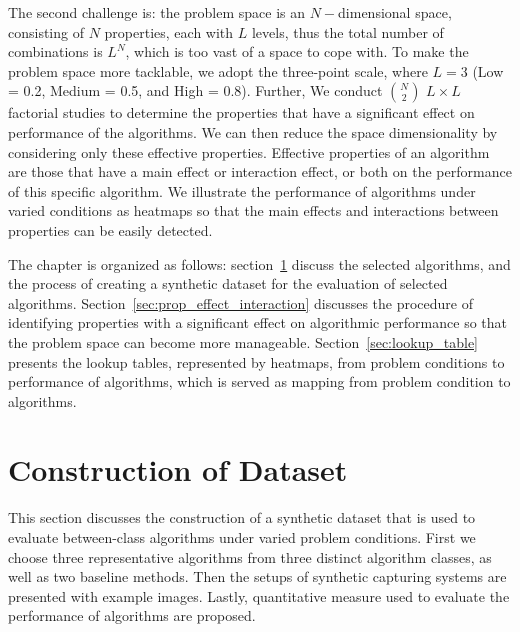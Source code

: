 The second challenge is: the problem space is an $N-$dimensional space, consisting of $N$ properties, each with $L$ levels, thus the total number of combinations is $L^N$, which is too vast of a space to cope with. To make the problem space more tacklable, we adopt the three-point scale, where $L=3$ (Low = 0.2, Medium = 0.5, and High = 0.8). Further, We conduct $\binom{N}{2}$ $L\times L$ factorial studies to determine the properties that have a significant effect on performance of the algorithms. We can then reduce the space dimensionality by considering only these effective properties. Effective properties of an algorithm are those that have a main effect or interaction effect, or both on the performance of this specific algorithm. We illustrate the performance of algorithms under varied conditions as heatmaps so that the main effects and interactions between properties can be easily detected.

The chapter is organized as follows: section~\ref{sec:create_synth_dataset} discuss the selected algorithms, and the process of creating a synthetic dataset for the evaluation of selected algorithms. Section~\ref{sec:prop_effect_interaction} discusses the procedure of identifying properties with a significant effect on algorithmic performance so that the problem space can become more manageable. Section~\ref{sec:lookup_table} presents the lookup tables, represented by heatmaps, from problem conditions to performance of algorithms, which is served as mapping from problem condition to algorithms.

\section{Construction of Dataset}
\label{sec:create_synth_dataset}
This section discusses the construction of a synthetic dataset that is used to evaluate between-class algorithms under varied problem conditions. First we choose three representative algorithms from three distinct algorithm classes, as well as two baseline methods. Then the setups of synthetic capturing systems are presented with example images. Lastly, quantitative measure used to evaluate the performance of algorithms are proposed.

